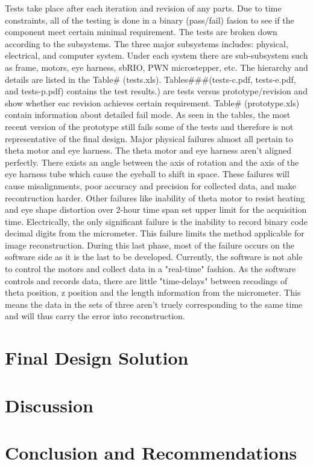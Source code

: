 \documentclass{article}
\begin{document}
Tests take place after each iteration and revision of any parts. Due to time constraints, all of the 
testing is done in a binary (pass/fail) fasion to see if the component meet certain minimal requirement. The 
tests are broken down according to the subsystems. The three major subsystems includes: physical, 
electrical, and computer system. Under each system there are sub-subsystem such as frame, motors, eye 
harness, sbRIO, PWN microstepper, etc.  The hierarchy and details are listed in the Table# (tests.xls). 
	Tables###(tests-c.pdf, tests-e.pdf, and tests-p.pdf) contains the test results.) are tests versus 
prototype/revision and show whether eac revision achieves certain requirement. Table# (prototype.xls)  
contain information about detailed fail mode. As seen in the tables, the most recent version of the prototype 
still fails some of the tests and therefore is not representative of the final design. Major physical failures 
almost all pertain to theta motor and eye harness. The theta motor and eye harness aren't aligned 
perfectly. There exists an angle between the axis of rotation and the axis of the eye harness tube which 
cause the eyeball to shift in space. These failures will cause misalignments, poor accuracy and precision 
for collected data, and make recontruction harder. Other failures like inability of theta motor to resist 
heating and eye shape distortion over 2-hour time span set upper limit for the acquisition time. Electrically, 
the only significant failure is the inability to record binary code decimal digits from the micrometer. This 
failure limits the method applicable for image reconstruction. 
	During this last phase, most of the failure occurs on the software side as it is the last to be 
developed. Currently, the software is not able to control the motors and collect data in a "real-time" fashion. 
As the software controls and records data, there are little "time-delays" between recodings of theta 
position, z position and the length information from the micrometer. This means the data in the sets of 
three aren't truely corresponding to the same time and will thus carry the error into reconstruction.






\section{Final Design Solution}
\label{sec:final-design-solut}

\section{Discussion}
\label{sec:discussion}

\section{Conclusion and Recommendations}
\label{sec:concl-recomm}

\newpage
{}


\end{document}
